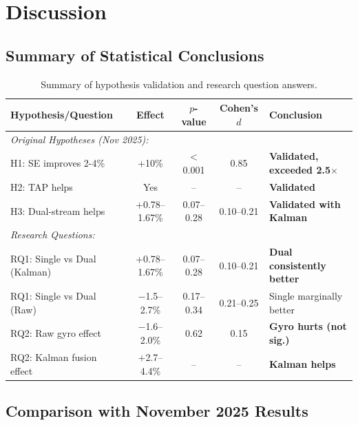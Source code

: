 \documentclass{article}
\begin{document}
\section{Discussion}

\subsection{Summary of Statistical Conclusions}

\begin{table}[htbp]
    \centering
    \caption{Summary of hypothesis validation and research question answers.}
    \label{tab:summary}
    \begin{tabular}{lcccp{4cm}}
        \toprule
        \textbf{Hypothesis/Question} & \textbf{Effect} & \textbf{$p$-value} & \textbf{Cohen's $d$} & \textbf{Conclusion} \\
        \midrule
        \multicolumn{5}{l}{\textit{Original Hypotheses (Nov 2025):}} \\
        H1: SE improves 2-4\% & +10\% & $<$0.001 & 0.85 & \textbf{Validated, exceeded 2.5$\times$} \\
        H2: TAP helps & Yes & -- & -- & \textbf{Validated} \\
        H3: Dual-stream helps & +0.78--1.67\% & 0.07--0.28 & 0.10--0.21 & \textbf{Validated with Kalman} \\
        \midrule
        \multicolumn{5}{l}{\textit{Research Questions:}} \\
        RQ1: Single vs Dual (Kalman) & +0.78--1.67\% & 0.07--0.28 & 0.10--0.21 & \textbf{Dual consistently better} \\
        RQ1: Single vs Dual (Raw) & $-$1.5--2.7\% & 0.17--0.34 & 0.21--0.25 & Single marginally better \\
        RQ2: Raw gyro effect & $-$1.6--2.0\% & 0.62 & 0.15 & \textbf{Gyro hurts (not sig.)} \\
        RQ2: Kalman fusion effect & +2.7--4.4\% & -- & -- & \textbf{Kalman helps} \\
        \bottomrule
    \end{tabular}
\end{table}

\subsection{Comparison with November 2025 Results}
\end{document}
